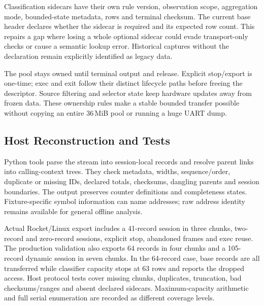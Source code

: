 Classification sidecars have their own rule version, observation scope, aggregation mode, bounded-state metadata, rows and terminal checksum. The current base header declares whether the sidecar is required and its expected row count. This repairs a gap where losing a whole optional sidecar could evade transport-only checks or cause a semantic lookup error. Historical captures without the declaration remain explicitly identified as legacy data.

The pool stays owned until terminal output and release. Explicit stop/export is one-time; exec and exit follow their distinct lifecycle paths before freeing the descriptor. Source filtering and selector state keep hardware updates away from frozen data. These ownership rules make a stable bounded transfer possible without copying an entire 36\,MiB pool or running a huge UART dump.

\subsection{Host Reconstruction and Tests}
Python tools parse the stream into session-local records and resolve parent links into calling-context trees. They check metadata, widths, sequence/order, duplicate or missing IDs, declared totals, checksums, dangling parents and session boundaries. The output preserves counter definitions and completeness states. Fixture-specific symbol information can name addresses; raw address identity remains available for general offline analysis.

Actual Rocket/Linux export includes a 41-record session in three chunks, two-record and zero-record sessions, explicit stop, abandoned frames and exec reuse. The production validation also exports 64 records in four chunks and a 105-record dynamic session in seven chunks. In the 64-record case, base records are all transferred while classifier capacity stops at 63 rows and reports the dropped access. Host protocol tests cover missing chunks, duplicates, truncation, bad checksums/ranges and absent declared sidecars. Maximum-capacity arithmetic and full serial enumeration are recorded as different coverage levels.
